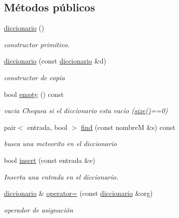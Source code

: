 \subsection*{\-Métodos públicos}
\begin{DoxyCompactItemize}
\item 
\hyperlink{classdiccionario_a60c722b06ff7e050bae71601f74d7549}{diccionario} ()
\begin{DoxyCompactList}\small\item\em constructor primitivo. \end{DoxyCompactList}\item 
\hyperlink{classdiccionario_a19558e1ad869a8791741b1359c87d80b}{diccionario} (const \hyperlink{classdiccionario}{diccionario} \&d)
\begin{DoxyCompactList}\small\item\em constructor de copia \end{DoxyCompactList}\item 
bool \hyperlink{classdiccionario_a8df27c218ef713041e09c9f799a1e9e6}{empty} () const 
\begin{DoxyCompactList}\small\item\em vacia \-Chequea si el diccionario esta vacio (\hyperlink{classdiccionario_a441fdeeb87c717757f5f7ff50612d57e}{size()}==0) \end{DoxyCompactList}\item 
pair$<$ entrada, bool $>$ \hyperlink{classdiccionario_a5ce69ac88959ca76c60fe0875690320f}{find} (const nombre\-M \&s) const 
\begin{DoxyCompactList}\small\item\em busca una meteorito en el diccionario \end{DoxyCompactList}\item 
bool \hyperlink{classdiccionario_abda03cfdf5848a07b2d93ebdc1238d27}{insert} (const entrada \&e)
\begin{DoxyCompactList}\small\item\em \-Inserta una entrada en el diccionario. \end{DoxyCompactList}\item 
\hyperlink{classdiccionario}{diccionario} \& \hyperlink{classdiccionario_af34ed220d3e0faa56cbe713b97766f02}{operator=} (const \hyperlink{classdiccionario}{diccionario} \&org)
\begin{DoxyCompactList}\small\item\em operador de asignación \end{DoxyCompactList}\item 

\end{DoxyCompactItemize}
